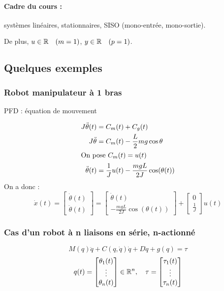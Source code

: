 \documentclass[main.tex]{subfiles}
\begin{document}
\paragraph{Cadre du cours :} systèmes linéaires, stationnaires, SISO (mono-entrée, mono-sortie).

De plus, $u\in\mathbb{R} \quad (m=1)$, $y\in\mathbb{R} \quad (p=1)$.


\subsection{Quelques exemples}

\subsubsection{Robot manipulateur à 1 bras}

PFD : équation de mouvement

\begin{align*}
J\ddot{\theta}(t) & = C_m(t) + C_g(t)\\
J\ddot{\theta} & = C_m(t) - \frac{L}{2}mg\cos\theta \\
\intertext{On pose $C_m(t) = u(t)$}
\ddot{\theta}(t) & = \frac{1}{J}u(t) - \frac{mgL}{2J}\cos(\theta(t))
\end{align*}
On a donc :
\[
\dot{x}(t) =
\left[
\begin{array}{cc}
\dot{\theta}(t) \\
\ddot{\theta}(t)
\end{array}
\right]
=
\left[
\begin{array}{cc}
\dot{\theta}(t) \\
-\frac{mgL}{2J}\cos(\theta(t))
\end{array}
\right]
+
\left[
\begin{array}{cc}
0 \\ \frac{1}{J}
\end{array}
\right] u(t)
\]

\subsubsection{Cas d'un robot à n liaisons en série, n-actionné}

\[M(q) \ddot{q} + C(q,\dot{q}) \dot{q} + D\dot{q} + g(q) = \tau \]
\[q(t) = \begin{bmatrix} 
\theta_1(t) \\
\vdots \\
\theta_n(t)
 \end{bmatrix}
\in \mathbb{R}^n, \quad
\tau =
\begin{bmatrix} 
\tau_1(t) \\
\vdots \\
\tau_n(t)
 \end{bmatrix}\]
\end{document}
